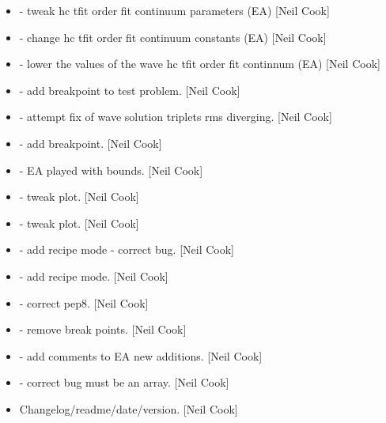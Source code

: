 \documentclass[a4paper,10pt,english]{report}
\begin{document}
\begin{itemize}
\item {} 
 - tweak hc tfit order fit
continuum parameters (EA) {[}Neil Cook{]}

\item {} 
 - change hc tfit order
fit continuum constants (EA) {[}Neil Cook{]}

\item {} 
 - lower the values of the
wave hc tfit order fit continnum (EA) {[}Neil Cook{]}

\item {} 
 - add breakpoint to test problem. {[}Neil Cook{]}

\item {} 
 - attempt fix of wave solution triplets rms
diverging. {[}Neil Cook{]}

\item {} 
 - add breakpoint. {[}Neil Cook{]}

\item {} 
 - EA played with bounds. {[}Neil Cook{]}

\item {} 
 - tweak plot. {[}Neil Cook{]}

\item {} 
 - tweak plot. {[}Neil Cook{]}

\item {} 
 - add recipe mode - correct
bug. {[}Neil Cook{]}

\item {} 
 - add recipe mode. {[}Neil
Cook{]}

\item {} 
 - correct pep8. {[}Neil Cook{]}

\item {} 
 - remove break points. {[}Neil Cook{]}

\item {} 
 - add comments to EA new additions. {[}Neil
Cook{]}

\item {} 
 - correct bug  must be an array. {[}Neil
Cook{]}

\item {} 
Changelog/readme/date/version. {[}Neil Cook{]}

\end{itemize}
\end{document}
